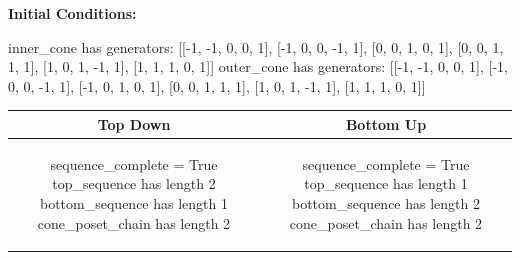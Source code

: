 \documentclass[10pt]{article}
\begin{document}
\textbf{Initial Conditions:}
\begin{SAGE}
inner_cone has generators: 
[[-1, -1, 0, 0, 1], [-1, 0, 0, -1, 1], [0, 0, 1, 0, 1], [0, 0, 1, 1, 1], [1, 0, 1, -1, 1], [1, 1, 1, 0, 1]]
outer_cone has generators: 
[[-1, -1, 0, 0, 1], [-1, 0, 0, -1, 1], [-1, 0, 1, 0, 1], [0, 0, 1, 1, 1], [1, 0, 1, -1, 1], [1, 1, 1, 0, 1]]

\end{SAGE}
\begin{tabular}{c|c}
\textbf{Top Down} & \textbf{Bottom Up} \\ \hline  
\begin{SAGE}
sequence_complete = True
top_sequence has length 2
bottom_sequence has length 1
cone_poset_chain has length 2
\end{SAGE} 
&
\begin{SAGE}
sequence_complete = True
top_sequence has length 1
bottom_sequence has length 2
cone_poset_chain has length 2
\end{SAGE} 
\\ \hline


\end{tabular}
\end{document}
